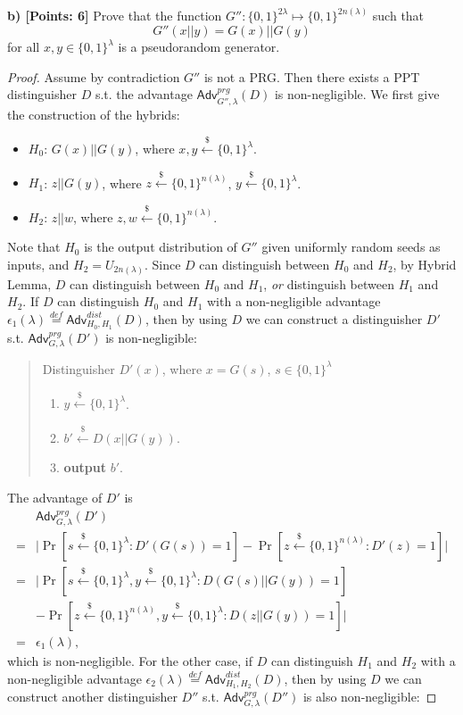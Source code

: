 \documentclass[12pt]{article}
\newcommand{\eqdef}{\stackrel{def}{=}}
\newcommand{\bits}{\{0,1\}}
\newcommand{\getsr}{\stackrel{\$}{\gets}}
\newcommand{\Adv}{\textsf{Adv}}
\theoremstyle{definition}
\begin{document}
{\bf b) [Points: 6]} Prove that the function $G'' : \bits^{2\lambda} \mapsto \bits^{2n(\lambda)}$ such that
$$G''(x||y) = G(x)||G(y)$$
for all $x,y\in\bits^\lambda$ is a pseudorandom generator.
\begin{proof}
Assume by contradiction $G''$ is not a PRG. Then there exists a PPT distinguisher $D$ s.t. the advantage $\Adv_{G'',\lambda}^{prg}(D)$ is non-negligible. We first give the construction of the hybrids:
\begin{itemize}
\item $H_0$: $G(x)||G(y)$, where $x, y \getsr\bits^\lambda$.
\item $H_1$: $z||G(y)$, where $z\getsr\bits^{n(\lambda)}$, $y\getsr\bits^\lambda$.
\item $H_2$: $z||w$, where $z,w\getsr\bits^{n(\lambda)}$.
\end{itemize}
Note that $H_0$ is the output distribution of $G''$ given uniformly random seeds as inputs, and $H_2 = U_{2n(\lambda)}$.
Since $D$ can distinguish between $H_0$ and $H_2$, by Hybrid Lemma, $D$ can distinguish between $H_0$ and $H_1$, \emph{or} distinguish between $H_1$ and $H_2$. If $D$ can distinguish $H_0$ and $H_1$ with a non-negligible advantage $\epsilon_1(\lambda) \eqdef \Adv_{H_0,H_1}^{dist}(D)$, then by using $D$ we can construct a distinguisher $D'$ s.t. $\Adv_{G,\lambda}^{prg}(D')$ is non-negligible:
\begin{quote}
Distinguisher $D' (x)$, where $x=G(s)$, $s\in\bits^\lambda$
\begin{enumerate}
\item $y\getsr\bits^{\lambda}$.
\item $b' \getsr D(x||G(y))$.
\item {\bf output} $b'$.
\end{enumerate}
\end{quote}
The advantage of $D'$ is 
$$
\begin{aligned}
& \Adv_{G,\lambda}^{prg}(D') \\
=& \bigg| \Pr[s\getsr\bits^\lambda : D'(G(s))=1] - \Pr[z\getsr\bits^{n(\lambda)}: D'(z)=1] \bigg| \\
=& \bigg| \Pr[s\getsr\bits^\lambda, y\getsr\bits^\lambda : D(G(s)||G(y))=1]\\
& - \Pr[z\getsr\bits^{n(\lambda)}, y\getsr\bits^\lambda: D(z||G(y))=1] \bigg| \\
=& \epsilon_1(\lambda),
\end{aligned}
$$
which is non-negligible. For the other case, if $D$ can distinguish $H_1$ and $H_2$ with a non-negligible advantage $\epsilon_2(\lambda) \eqdef \Adv_{H_1,H_2}^{dist}(D)$, then by using $D$ we can construct another distinguisher $D''$ s.t. $\Adv_{G,\lambda}^{prg}(D'')$ is also non-negligible:

\end{proof}
\end{document}
